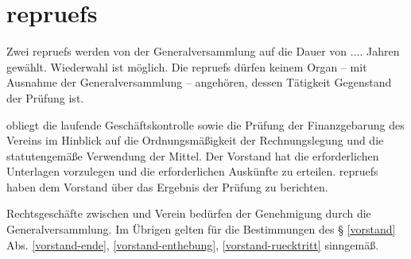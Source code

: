 \documentclass{article}
\begin{document}
\section{\glspl{repruef}}\label{rechnungspruefung}
\begin{absatz}
    \item Zwei \glspl{repruef} werden von der Generalversammlung auf die Dauer von
    .... Jahren gewählt. Wiederwahl ist möglich. Die \glspl{repruef} dürfen keinem Organ – mit Ausnahme der Generalversammlung – angehören, dessen Tätigkeit Gegenstand der Prüfung ist.
    \item {} obliegt die laufende Geschäftskontrolle sowie die Prüfung der Finanzgebarung des Vereins im Hinblick auf die Ordnungsmäßigkeit der Rechnungslegung und die statutengemäße Verwendung der Mittel. Der Vorstand hat  die erforderlichen Unterlagen vorzulegen und die erforderlichen Auskünfte zu erteilen. \Glspl{repruef} haben dem Vorstand über das Ergebnis der Prüfung zu berichten.
    \item Rechtsgeschäfte zwischen  und Verein bedürfen der Genehmigung durch die Generalversammlung. Im Übrigen gelten für  die Bestimmungen des § \ref{vorstand} Abs. \ref{vorstand-ende}, \ref{vorstand-enthebung}, \ref{vorstand-ruecktritt} sinngemäß.
\end{absatz}
\end{document}
